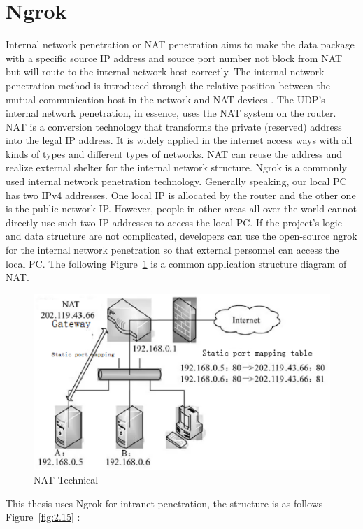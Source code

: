 \section{Ngrok}
\label{sec:Ngrok}
Internal network penetration or NAT penetration aims to make the data package with a specific source IP address and source port number not block from NAT but will route to the internal network host correctly. The internal network penetration method is introduced through the relative position between the mutual communication host in the network and NAT devices \cite{parlika2020implementasi}. 
The UDP’s internal network penetration, in essence, uses the NAT system on the router. NAT is a conversion technology that transforms the private (reserved) address into the legal IP address. It is widely applied in the internet access ways with all kinds of types and different types of networks. NAT can reuse the address and realize external shelter for the internal network structure. 
Ngrok is a commonly used internal network penetration technology. Generally speaking, our local PC has two IPv4 addresses. One local IP is allocated by the router and the other one is the public network IP. However, people in other areas all over the world cannot directly use such two IP addresses to access the local PC. If the project’s logic and data structure are not complicated, developers can use the open-source ngrok for the internal network penetration so that external personnel can access the local PC. 
The following Figure~\ref{fig:2.14}  is a common application structure diagram of NAT.
\begin{figure}[!ht]
	\centering
	\includegraphics {grafiken/2.14.eps}
	\caption{NAT-Technical} 
	\label{fig:2.14}
\end{figure}
\FloatBarrier
This thesis uses Ngrok for intranet penetration, the structure is as follows Figure~\ref{fig:2.15} :

